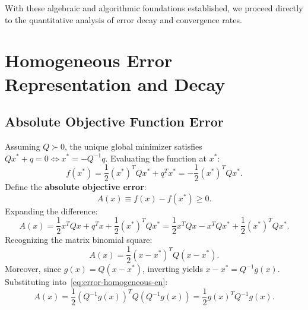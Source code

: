 With these algebraic and algorithmic foundations established, we proceed directly to the quantitative analysis of error decay and convergence rates.

\FloatBarrier
\section{Homogeneous Error Representation and Decay}
\label{sec:homogeneous-error-decay}

\subsection{Absolute Objective Function Error}
Assuming $Q \succ 0$, the unique global minimizer satisfies $Q x^* + q = 0 \iff x^* = -Q^{-1}q$. Evaluating the function at $x^*$:
\begin{equation}
    f(x^*) = \frac{1}{2} (x^*)^T Q x^* + q^T x^* = -\frac{1}{2} (x^*)^T Q x^*.
\end{equation}
Define the \textbf{absolute objective error}:
\begin{equation}
    A(x) \equiv f(x) - f(x^*) \ge 0.
\end{equation}
Expanding the difference:
\begin{equation}
    A(x) = \frac{1}{2} x^T Q x + q^T x + \frac{1}{2} (x^*)^T Q x^* = \frac{1}{2} x^T Q x - x^T Q x^* + \frac{1}{2} (x^*)^T Q x^*.
\end{equation}
Recognizing the matrix binomial square:
\begin{equation}
    A(x) = \frac{1}{2} (x - x^*)^T Q (x - x^*).
    \label{eq:error-homogeneous-en}
\end{equation}
Moreover, since $g(x) = Q(x - x^*)$, inverting yields $x - x^* = Q^{-1} g(x)$. Substituting into~\eqref{eq:error-homogeneous-en}:
\begin{equation}
    A(x) = \frac{1}{2} (Q^{-1} g(x))^T Q (Q^{-1} g(x)) = \frac{1}{2} g(x)^T Q^{-1} g(x).
    \label{eq:error-gradient-dual-en}
\end{equation}

